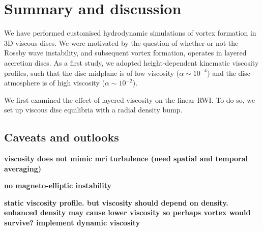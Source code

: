 \clearpage
\section{Summary and discussion}\label{summary}
We have performed customised hydrodynamic simulations of vortex
formation in 3D viscous discs. We were motivated  
by the question of whether or not the Rossby wave instability, and
subsequent vortex formation, operates in layered accretion discs.  As
a first study, we adopted height-dependent kinematic viscosity
profiles, such that the disc midplane is of low viscosity ($\alpha\sim
10^{-4}$) and the disc atmosphere is of high viscosity ($\alpha\sim
10^{-2}$). 

We first examined the effect of layered viscosity on the linear
RWI. To do so, we set up viscous disc equilibria with a radial density
bump. 

\subsection{Caveats and outlooks}\label{caveats}
{\bf viscosity does not mimic mri turbulence (need spatial and
  temporal averaging)}

{\bf no magneto-elliptic instability}

{\bf static viscosity profile. but viscosity should depend on
  density. enhanced density may cause lower viscosity so perhaps vortex would
  survive? implement dynamic viscosity} 

